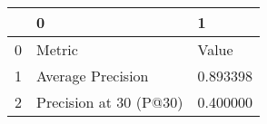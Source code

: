 \begin{tabular}{lll}
\toprule
 & 0 & 1 \\
\midrule
0 & Metric & Value \\
1 & Average Precision & 0.893398 \\
2 & Precision at 30 (P@30) & 0.400000 \\
\bottomrule
\end{tabular}
